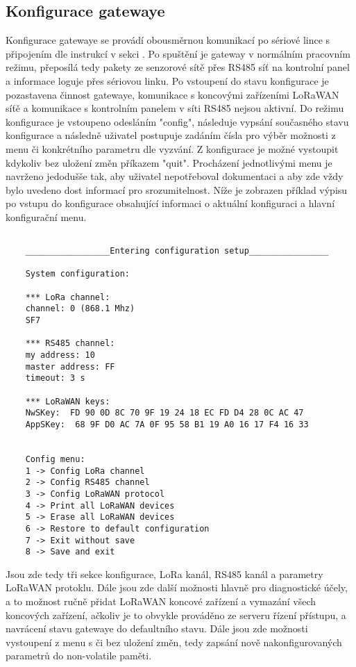 \subsection{Konfigurace gatewaye}
\label{Konfigurace gatewaye}
Konfigurace gatewaye se provádí obousměrnou komunikací po sériové lince s připojením dle instrukcí v sekci .
Po spuštění je gateway v normálním pracovním režimu, přeposílá tedy pakety ze senzorové sítě přes RS485 síť na kontrolní panel a informace loguje přes sériovou linku.
Po vstoupení do stavu konfigurace je pozastavena činnost gatewaye, komunikace s koncovými zařízeními LoRaWAN síťě a komunikace s kontrolním panelem v síti RS485 nejsou aktivní.
Do režimu konfigurace je vstoupeno odesláním "config", následuje vypsání současného stavu konfigurace a následně uživatel postupuje zadáním čísla pro výběr možnosti z menu či konkrétního parametru dle vyzvání. Z konfigurace je možné vystoupit kdykoliv bez uložení změn příkazem "quit". 
Procházení jednotlivými menu je navrženo jedodušše tak, aby uživatel nepotřeboval dokumentaci a aby zde vždy bylo uvedeno dost informací pro srozumitelnost.
Níže je zobrazen příklad výpisu po vstupu do konfigurace obsahující informaci o aktuální konfiguraci a hlavní konfigurační menu.

\begin{lstlisting}[style=log]

    _________________Entering configuration setup________________
    
    System configuration:
    
    *** LoRa channel: 
    channel: 0 (868.1 Mhz)
    SF7
    
    *** RS485 channel: 
    my address: 10
    master address: FF
    timeout: 3 s
    
    *** LoRaWAN keys: 
    NwSKey:  FD 90 0D 8C 70 9F 19 24 18 EC FD D4 28 0C AC 47
    AppSKey:  68 9F D0 AC 7A 0F 95 58 B1 19 A0 16 17 F4 16 33
    
    
    Config menu:
    1 -> Config LoRa channel
    2 -> Config RS485 channel
    3 -> Config LoRaWAN protocol
    4 -> Print all LoRaWAN devices
    5 -> Erase all LoRaWAN devices
    6 -> Restore to default configuration
    7 -> Exit without save
    8 -> Save and exit
\end{lstlisting}


Jsou zde tedy tři sekce konfigurace, LoRa kanál, RS485 kanál a parametry LoRaWAN protoklu.
Dále jsou zde další možnosti hlavně pro diagnostické účely, a to možnost ručně přidat LoRaWAN koncové zařízení a vymazání všech koncových zařízení, ačkoliv je to obvykle prováděno ze serveru řízení přístupu, a navrácení stavu gatewaye do defaultního stavu. Dále jsou zde možnosti vystoupení z menu s či bez uložení změn, tedy zapsání nově nakonfigurovaných parametrů do non-volatile paměti.

